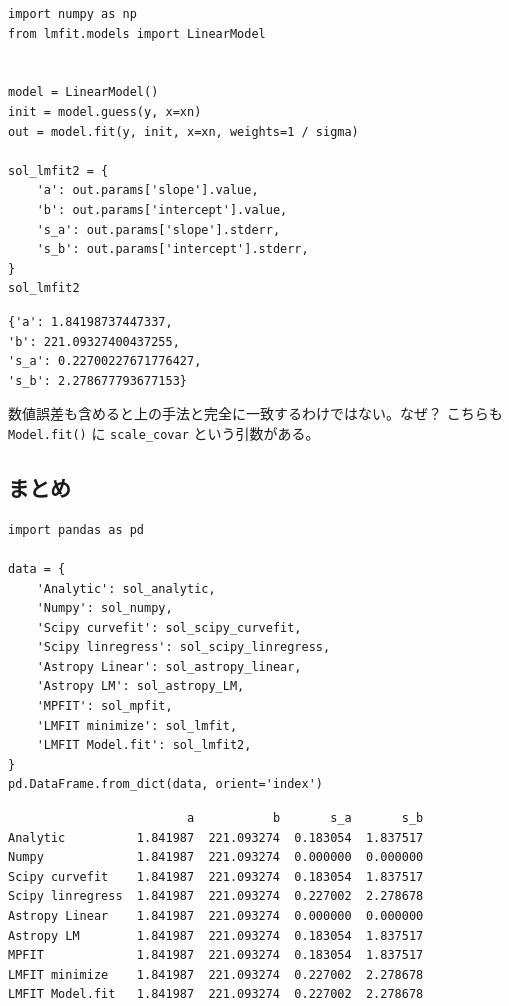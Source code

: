 \documentclass[a4paper, 9pt, notitlepage, uplatex, dvipdfmx]{jsarticle}
\begin{document}
\begin{verbatim}
import numpy as np
from lmfit.models import LinearModel


model = LinearModel()
init = model.guess(y, x=xn)
out = model.fit(y, init, x=xn, weights=1 / sigma)

sol_lmfit2 = {
    'a': out.params['slope'].value,
    'b': out.params['intercept'].value,
    's_a': out.params['slope'].stderr,
    's_b': out.params['intercept'].stderr,
}
sol_lmfit2
\end{verbatim}

\label{}
\begin{verbatim}
{'a': 1.84198737447337,
'b': 221.09327400437255,
's_a': 0.22700227671776427,
's_b': 2.278677793677153}
\end{verbatim}

数値誤差も含めると上の手法と完全に一致するわけではない。なぜ？
こちらも \texttt{Model.fit()} に \texttt{scale\_covar} という引数がある。
\subsection{まとめ}
\label{sec:org9fd8fce}
\begin{verbatim}
import pandas as pd

data = {
    'Analytic': sol_analytic,
    'Numpy': sol_numpy,
    'Scipy curvefit': sol_scipy_curvefit,
    'Scipy linregress': sol_scipy_linregress,
    'Astropy Linear': sol_astropy_linear,
    'Astropy LM': sol_astropy_LM,
    'MPFIT': sol_mpfit,
    'LMFIT minimize': sol_lmfit,
    'LMFIT Model.fit': sol_lmfit2,
}
pd.DataFrame.from_dict(data, orient='index')
\end{verbatim}

\label{}
\begin{verbatim}
                         a           b       s_a       s_b
Analytic          1.841987  221.093274  0.183054  1.837517
Numpy             1.841987  221.093274  0.000000  0.000000
Scipy curvefit    1.841987  221.093274  0.183054  1.837517
Scipy linregress  1.841987  221.093274  0.227002  2.278678
Astropy Linear    1.841987  221.093274  0.000000  0.000000
Astropy LM        1.841987  221.093274  0.183054  1.837517
MPFIT             1.841987  221.093274  0.183054  1.837517
LMFIT minimize    1.841987  221.093274  0.227002  2.278678
LMFIT Model.fit   1.841987  221.093274  0.227002  2.278678
\end{verbatim}
\end{document}

